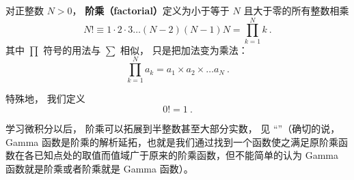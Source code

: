 
\begin{issues}
\issueDraft
\end{issues}

对正整数 $N > 0$， \textbf{阶乘（factorial）}定义为小于等于 $N$ 且大于零的所有整数相乘
\begin{equation}
N! \equiv 1 \cdot 2 \cdot 3 \dots (N - 2) (N - 1)N = \prod_{k = 1}^N k~.
\end{equation}
其中 $\prod$ 符号的用法与 $\sum$ 相似， 只是把加法变为乘法：
\begin{equation}
\prod_{k = 1}^N a_k = a_1\times a_2\times \dots a_N~.
\end{equation}


特殊地， 我们定义
\begin{equation}
0! = 1~.
\end{equation}

学习微积分以后， 阶乘可以拓展到半整数甚至大部分实数， 见 “”（确切的说，Gamma 函数是阶乘的解析延拓，也就是我们通过找到一个函数使之满足原阶乘函数在各已知点处的取值而值域广于原来的阶乘函数，但不能简单的认为 Gamma 函数就是阶乘或者阶乘就是 Gamma 函数）。
